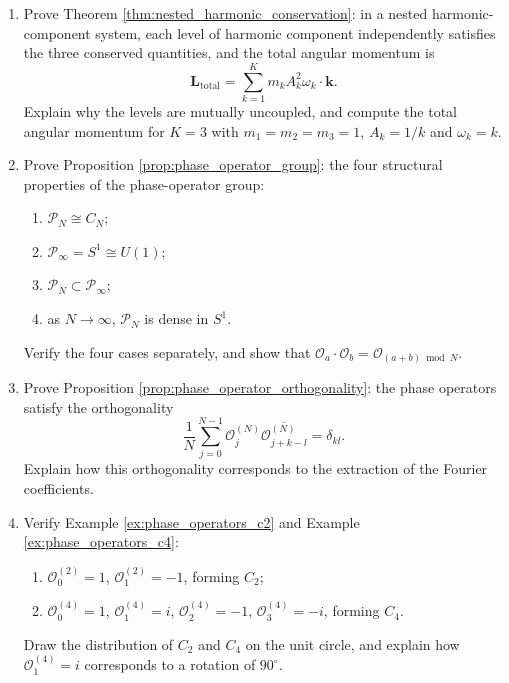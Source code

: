 \begin{enumerate}[leftmargin=3em, label=\textbf{Exercise \arabic*}]
    \item Prove Theorem \ref{thm:nested_harmonic_conservation}:
    in a nested harmonic-component system, each level of harmonic component independently satisfies the three conserved quantities,
    and the total angular momentum is
    \[
    \mathbf{L}_{\text{total}}=\sum_{k=1}^K m_kA_k^2\omega_k\cdot\mathbf{k}.
    \]
    Explain why the levels are mutually uncoupled,
    and compute the total angular momentum for $K=3$ with $m_1=m_2=m_3=1$, $A_k=1/k$ and $\omega_k=k$.

    \item Prove Proposition \ref{prop:phase_operator_group}:
    the four structural properties of the phase-operator group:
    \begin{enumerate}[label=(\roman*)]
        \item $\mathcal{P}_N\cong C_N$;
        \item $\mathcal{P}_\infty=S^1\cong U(1)$;
        \item $\mathcal{P}_N\subset\mathcal{P}_\infty$;
        \item as $N\to\infty$, $\mathcal{P}_N$ is dense in $S^1$.
    \end{enumerate}
    Verify the four cases separately, and show that $\mathcal{O}_a\cdot\mathcal{O}_b=\mathcal{O}_{(a+b)\bmod N}$.

    \item Prove Proposition \ref{prop:phase_operator_orthogonality}:
    the phase operators satisfy the orthogonality
    \[
    \frac{1}{N}\sum_{j=0}^{N-1}\mathcal{O}_j^{(N)}\overline{\mathcal{O}_{j+k-l}^{(N)}}=\delta_{kl}.
    \]
    Explain how this orthogonality corresponds to the extraction of the Fourier coefficients.

    \item Verify Example \ref{ex:phase_operators_c2} and Example \ref{ex:phase_operators_c4}:
    \begin{enumerate}[label=(\roman*)]
        \item $\mathcal{O}_0^{(2)}=1$, $\mathcal{O}_1^{(2)}=-1$, forming $C_2$;
        \item $\mathcal{O}_0^{(4)}=1$, $\mathcal{O}_1^{(4)}=i$, $\mathcal{O}_2^{(4)}=-1$, $\mathcal{O}_3^{(4)}=-i$, forming $C_4$.
    \end{enumerate}
    Draw the distribution of $C_2$ and $C_4$ on the unit circle,
    and explain how $\mathcal{O}_1^{(4)}=i$ corresponds to a rotation of $90^\circ$.


\end{enumerate}
